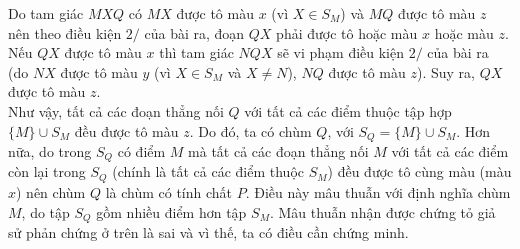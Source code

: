 \begin{bt}
{\begin{center}
		\end{center}
		Do tam giác $MXQ$ có $MX$ được tô màu $x$ (vì $X\in S_M$) và $MQ$ được tô màu $z$ nên theo điều kiện $2/$ của bài ra, đoạn $QX$ phải được tô hoặc màu $x$ hoặc màu $z$. Nếu $QX$ được tô màu $x$ thì tam giác $NQX$ sẽ vi phạm điều kiện $2/$ của bài ra (do $NX$ được tô màu $y$ (vì $X\in S_M$ và $X\ne N$), $NQ$ được tô màu $z$). Suy ra, $QX$ được tô màu $z$.\\
		Như vậy, tất cả các đoạn thẳng nối $Q$ với tất cả các điểm thuộc tập hợp $\{M\}\cup S_M$ đều được tô màu $z$. Do đó,  ta có chùm $Q$, với $S_Q=\{M\}\cup S_M$. Hơn nữa, do trong $S_Q$ có điểm $M$ mà tất cả các đoạn thẳng nối $M$ với tất cả các điểm còn lại trong $S_Q$ (chính là tất cả các điểm thuộc $S_M$) đều được tô cùng màu (màu $x$) nên chùm $Q$ là chùm có tính chất $P$. Điều này mâu thuẫn với định nghĩa chùm $M$, do tập $S_Q$ gồm nhiều điểm hơn tập $S_M$. Mâu thuẫn nhận được chứng tỏ giả sử phản chứng ở trên là sai và vì thế, ta có điều cần chứng minh.
		
}
\end{bt}
